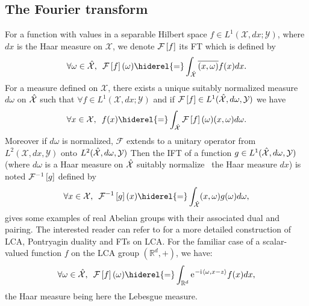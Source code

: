\subsection{The Fourier transform}
For a function with values in a separable Hilbert space $f\in L^1(\mathcal{X},dx;\mathcal{Y})$, where $dx$ is the Haar measure on $\mathcal{X}$, we denote $\mathcal{F}\left[f\right]$ its \acf{FT} which is defined by
\begin{dmath*}
    \forall \omega \in \dual{\mathcal{X}},\enskip \FT{f}(\omega) \hiderel{=}\int_{\dual{\mathcal{X}}} \conj{\pairing{x,\omega}}f(x)dx.
\end{dmath*} 
For a measure defined on $\mathcal{X}$, there exists a unique suitably normalized measure $d\omega$ on $\hat{\mathcal{X}}$ such that $\forall f \in L^1(\mathcal{X}, dx;\mathcal{Y})$ and if $\mathcal{F}\left[f\right] \in L^1(\hat{\mathcal{X}}, d\omega, \mathcal{Y})$ we have
 \begin{dmath}\label{fourier-l1}
 \forall x \in \mathcal{X},\enskip f(x)\hiderel{=}\int_{\dual{\mathcal{X}}}\FT{f}(\omega)(x,\omega) d\omega.
\end{dmath}
Moreover if $d\omega$ is normalized, $\mathcal{F}$ extends to a unitary operator from $L^2(\mathcal{X}, dx, \mathcal{Y})$ onto $L^2(\hat{\mathcal{X}}, d\omega, \mathcal{Y})$ Then the \acf{IFT} of a function $g\in L^1(\hat{\mathcal{X}},d\omega,\mathcal{Y})$ (where $d\omega$ is a Haar measure on $\hat{\mathcal{X}}$ suitably normalize \wrt~the Haar measure $dx$) is noted $\mathcal{F}^{-1}\left[g\right]$ defined by
\begin{dmath*}
    \forall x \in \mathcal{X},\enskip \IFT{g}(x) \hiderel{=} \int_{\dual{\mathcal{X}}} \pairing{x,\omega}g(\omega) d\omega,
\end{dmath*}
 gives some examples of real Abelian groups with their associated dual and pairing. The interested reader can refer to \citet{folland1994course} for a more detailed construction of LCA, Pontryagin duality and \acl{FT}s on LCA. For the familiar case of a scalar-valued function $f$ on the \acs{LCA} group $(\mathbb{R}^d, +)$, we have: 
 \begin{dmath}\label{fourier-R-plus}
 \forall \omega \in \dual{\mathcal{X}},\enskip \FT{f}(\omega)\hiderel{=}\int_{\mathbb{R}^d} \ec^{-\iu \inner{\omega,x - z}}f(x) dx,
\end{dmath}
the Haar measure being here the Lebesgue measure.

